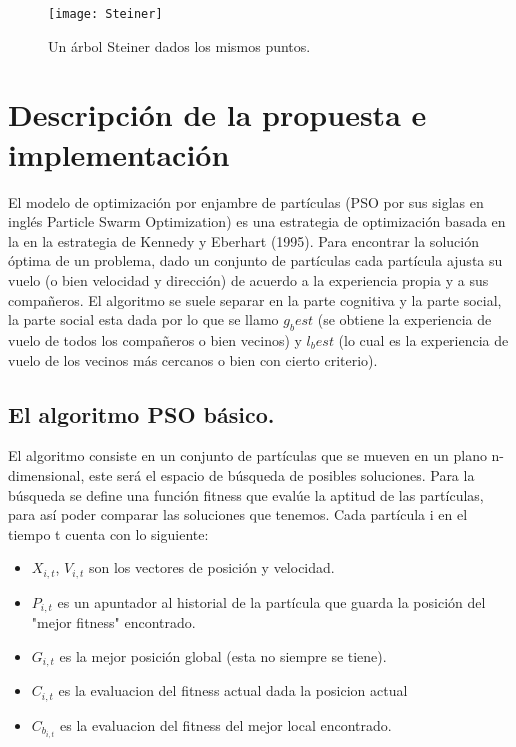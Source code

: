 \documentclass[11pt,letterpaper]{article}
\begin{document}
\begin{figure}
	\centering
	\texttt{[image: Steiner]}
	\caption{Un árbol Steiner dados los mismos puntos.}
	\label{fig:steiner}
\end{figure}


\section{Descripción de la propuesta e implementación}

El modelo de optimización por enjambre de partículas (PSO por sus siglas en inglés Particle Swarm Optimization) es una estrategia de optimización basada en la en la estrategia de Kennedy y Eberhart (1995). Para encontrar la solución óptima de un problema, dado un conjunto de partículas cada partícula  ajusta su vuelo (o bien velocidad y dirección) de acuerdo a la experiencia propia y a sus compañeros. El algoritmo se suele separar en la parte cognitiva y la parte social, la parte social esta dada por lo que se llamo $g_best$ (se obtiene la experiencia de vuelo de todos los compañeros o bien vecinos) y $l_best$ (lo cual es la experiencia de vuelo de los vecinos más cercanos o bien con cierto criterio)\cite{Kemmoe}.

\subsection{El algoritmo PSO básico.}

El algoritmo consiste en un conjunto de partículas que se mueven en un plano n-dimensional, este será el espacio de búsqueda de posibles soluciones. Para la búsqueda se define una función fitness que evalúe la aptitud de las partículas, para así poder comparar las soluciones que tenemos. Cada partícula i en el tiempo t cuenta con lo siguiente:

\begin{itemize}
\item $X_{i,t}$, $V_{i,t}$ son los vectores de posición y velocidad.
\item $P_{i,t}$ es un apuntador al historial de la partícula que guarda la posición del "mejor fitness" encontrado.
\item $G_{i,t}$ es la mejor posición global (esta no siempre se tiene).
\item $C_{i,t}$ es la evaluacion del fitness actual dada la posicion actual
\item $C_{b_{i,t}}$ es la evaluacion del fitness del mejor local encontrado.
\end{itemize}
\end{document}
